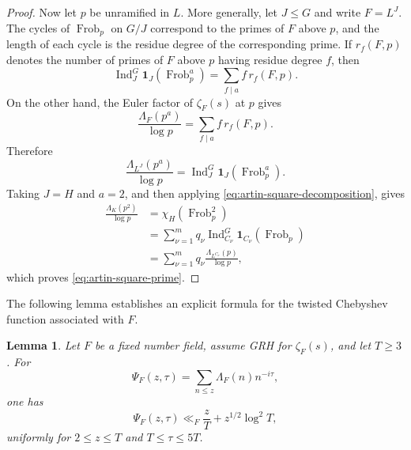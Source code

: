 \documentclass[twoside,reqno,11pt,a4paper]{amsart}
\numberwithin{equation}{section}
\theoremstyle{plain}
\newtheorem{lem}[thm]{Lemma}
\theoremstyle{definition}
\theoremstyle{remark}
\DeclareMathOperator{\Frob}{Frob}
\renewcommand{\le}{\leqslant}
\renewcommand{\ge}{\geqslant}
\begin{document}
\begin{proof}
Now let $p$ be unramified in $L$.  More generally, let $J\le G$ and
write $F = L^J$.  The cycles of $\Frob_p$ on $G/J$ correspond to the
primes of $F$ above $p$, and the length of each cycle is the residue
degree of the corresponding prime.  If $r_f(F,p)$ denotes the number
of primes of $F$ above $p$ having residue degree $f$, then
\begin{equation*}
\operatorname{Ind}_J^G\mathbf 1_J(\Frob_p^a)
=\sum_{f\mid a} f\,r_f(F,p).
\end{equation*}
On the other hand, the Euler factor of $\zeta_F(s)$ at $p$ gives
\begin{equation*}
\frac{\Lambda_F(p^a)}{\log p}
=\sum_{f\mid a} f\,r_f(F,p).
\end{equation*}
Therefore
\begin{equation*}
\frac{\Lambda_{L^J}(p^a)}{\log p}
=\operatorname{Ind}_J^G\mathbf 1_J(\Frob_p^a).
\end{equation*}
Taking $J=H$ and $a=2$, and then applying
\eqref{eq:artin-square-decomposition}, gives
\begin{equation*}
\begin{split}
\frac{\Lambda_K(p^2)}{\log p}
&=\chi_H(\Frob_p^2)\\
&=\sum_{\nu=1}^m q_\nu
\operatorname{Ind}_{C_\nu}^G\mathbf 1_{C_\nu}(\Frob_p)\\
&=\sum_{\nu=1}^m q_\nu
\frac{\Lambda_{L^{C_\nu}}(p)}{\log p},
\end{split}
\end{equation*}
which proves \eqref{eq:artin-square-prime}.
\end{proof}
The following lemma establishes an explicit formula for the twisted Chebyshev function associated with $F$.
\begin{lem}\label{lem:twisted-chebyshev}
Let $F$ be a fixed number field, assume GRH for $\zeta_F(s)$, and let
$T\ge3$.  For
\begin{equation*}
\Psi_F(z,\tau)=\sum_{n\le z}\Lambda_F(n)n^{-i\tau},
\end{equation*}
one has
\begin{equation}\label{eq:twisted-chebyshev-bound}
\Psi_F(z,\tau)\ll_F\frac zT+z^{1/2}\log^2T,
\end{equation}
uniformly for $2\le z\le T$ and $T\le\tau\le5T$.
\end{lem}
\end{document}
